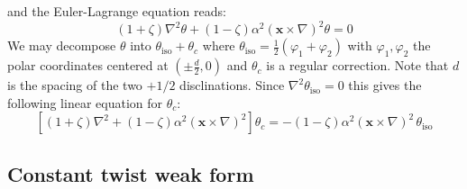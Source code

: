 \documentclass[reqno]{article}
\begin{document}
and the Euler-Lagrange equation reads:
\begin{equation}
    \left(1 + \zeta \right) \nabla^2 \theta
    +
    \left(1 - \zeta \right) \alpha^2 \left(
        \mathbf{x} \times \nabla
    \right)^2 \theta
    =
    0
\end{equation}
We may decompose $\theta$ into $\theta_\text{iso} + \theta_c$ where $\theta_\text{iso} = \frac12 \left(\varphi_1 + \varphi_2\right)$ with $\varphi_1, \varphi_2$ the polar coordinates centered at $\left(\pm \frac{d}{2}, 0\right)$ and $\theta_c$ is a regular correction.
Note that $d$ is the spacing of the two $+1/2$ disclinations. 
Since $\nabla^2 \theta_\text{iso} = 0$ this gives the following linear equation for $\theta_c$:
\begin{equation} \label{eq:constant-twist-euler-lagrange}
    \left[
        (1 + \zeta) \nabla^2 
        + (1 - \zeta) \alpha^2 \left(\mathbf{x} \times \nabla\right)^2
    \right] \theta_c
    =
    -(1 - \zeta) \alpha^2 \left(\mathbf{x} \times \nabla \right)^2 \, \theta_\text{iso}
\end{equation}

\subsection{Constant twist weak form}
\end{document}

